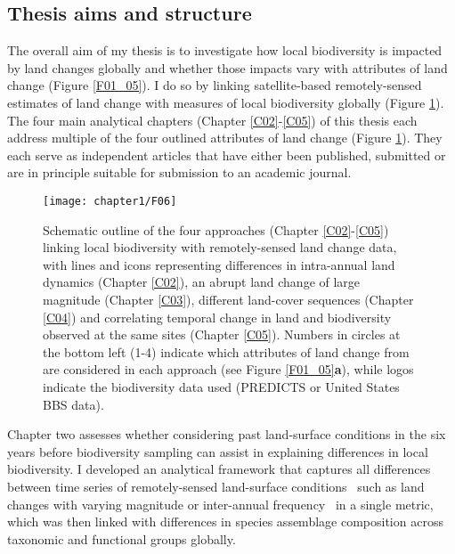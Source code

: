 \subsection{Thesis aims and structure}
\label{C01_0104}

The overall aim of my thesis is to investigate how local biodiversity is impacted by land changes globally and whether those impacts vary with attributes of land change  (Figure \ref{F01_05}). I do so by linking satellite-based remotely-sensed estimates of land change with measures of local biodiversity globally   (Figure \ref{F01_06}). The four main analytical chapters (Chapter \ref{C02}-\ref{C05}) of this thesis each address multiple of the four outlined attributes of land change (Figure \ref{F01_06}). They each serve as independent articles that have either been published, submitted or are in principle suitable for submission to an academic journal.

\begin{figure}[htb]
\centering
\texttt{[image: chapter1/F06]}
\caption{ Schematic outline of the four approaches (Chapter \ref{C02}-\ref{C05}) linking local biodiversity with remotely-sensed land change data, with lines and icons representing differences in intra-annual land dynamics (Chapter \ref{C02}), an abrupt land change of large magnitude (Chapter \ref{C03}), different land-cover sequences (Chapter \ref{C04}) and correlating temporal change in land and biodiversity observed at the same sites (Chapter \ref{C05}). Numbers in circles at the bottom left (1-4) indicate which attributes of land change from \cite{Watson2014} are considered in each approach (see Figure \ref{F01_05}\textbf{a}), while logos indicate the biodiversity data used (PREDICTS or United States BBS data). }
\label{F01_06}
\end{figure}

Chapter two assesses whether considering past land-surface conditions in the six years before biodiversity sampling can assist in explaining differences in local biodiversity. I developed an analytical framework that captures all differences between time series of remotely-sensed land-surface conditions \textendash\ such as land changes with varying magnitude or inter-annual frequency \textendash\ in a single metric, which was then linked with differences in species assemblage composition across taxonomic and functional groups globally. 

